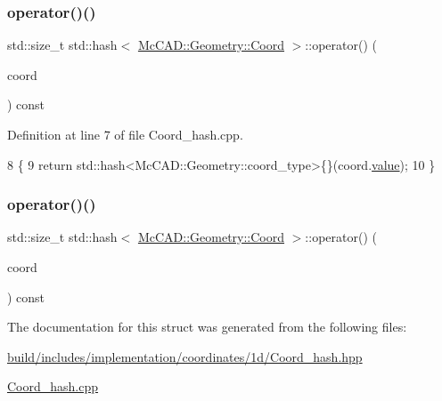 \subsubsection{\texorpdfstring{operator()()}{operator()()}\hspace{0.1cm}{\footnotesize\ttfamily [1/2]}}
{\footnotesize\ttfamily std\+::size\+\_\+t std\+::hash$<$ \hyperlink{classMcCAD_1_1Geometry_1_1Coord}{Mc\+C\+A\+D\+::\+Geometry\+::\+Coord} $>$\+::operator() (\begin{DoxyParamCaption}\item[{const \hyperlink{classMcCAD_1_1Geometry_1_1Coord}{Mc\+C\+A\+D\+::\+Geometry\+::\+Coord} \&}]{coord }\end{DoxyParamCaption}) const}



Definition at line 7 of file Coord\+\_\+hash.\+cpp.


\begin{DoxyCode}
8                                               \{
9     \textcolor{keywordflow}{return} std::hash<McCAD::Geometry::coord\_type>\{\}(coord.\hyperlink{classMcCAD_1_1Geometry_1_1Coord_a540aea93d3b1a9cfd505e1e0b96b2b91}{value});
10 \}
\end{DoxyCode}
\mbox{\label{structstd_1_1hash_3_01McCAD_1_1Geometry_1_1Coord_01_4_ab537af52eb4a5b8941a5b886289389c9}} 
\subsubsection{\texorpdfstring{operator()()}{operator()()}\hspace{0.1cm}{\footnotesize\ttfamily [2/2]}}
{\footnotesize\ttfamily std\+::size\+\_\+t std\+::hash$<$ \hyperlink{classMcCAD_1_1Geometry_1_1Coord}{Mc\+C\+A\+D\+::\+Geometry\+::\+Coord} $>$\+::operator() (\begin{DoxyParamCaption}\item[{const \hyperlink{classMcCAD_1_1Geometry_1_1Coord}{Mc\+C\+A\+D\+::\+Geometry\+::\+Coord} \&}]{coord }\end{DoxyParamCaption}) const}



The documentation for this struct was generated from the following files\+:\begin{DoxyCompactItemize}
\item 
\hyperlink{build_2includes_2implementation_2coordinates_21d_2Coord__hash_8hpp}{build/includes/implementation/coordinates/1d/\+Coord\+\_\+hash.\+hpp}\item 
\hyperlink{Coord__hash_8cpp}{Coord\+\_\+hash.\+cpp}\end{DoxyCompactItemize}

